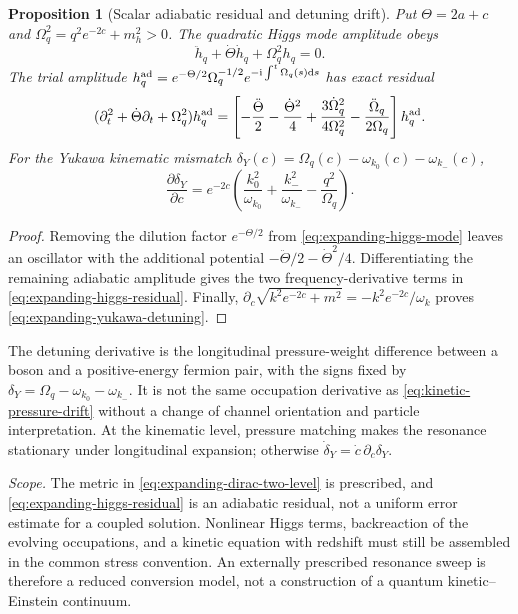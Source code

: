 \documentclass[11pt,a4paper,oneside]{book}
\theoremstyle{plain}
\newtheorem{proposition}[theorem]{Proposition}
\theoremstyle{definition}
\theoremstyle{remark}
\newcommand{\dd}{\mathrm d}
\newcommand{\ii}{\mathrm i}
\newcommand{\src}[2]{\cite{#1}}
\newcommand{\scope}[1]{\par\smallskip\noindent\textit{Scope.} #1\par\smallskip}
\begin{document}
\begin{proposition}[Scalar adiabatic residual and detuning drift]
\label{prop:expanding-scalar-detuning}
Put $\Theta=2a+c$ and $\Omega_q^2=q^2e^{-2c}+m_h^2>0$.
The quadratic Higgs mode amplitude obeys
\begin{equation}
 \ddot h_q+\dot\Theta\dot h_q+\Omega_q^2h_q=0.
 \label{eq:expanding-higgs-mode}
\end{equation}
The trial amplitude
$h_q^{\rm ad}=e^{-\Theta/2}\Omega_q^{-1/2}
 e^{-\ii\int^t\Omega_q(s)\dd s}$ has exact residual
\begin{equation}
 (\partial_t^2+\dot\Theta\partial_t+\Omega_q^2)h_q^{\rm ad}
 =\left[-\frac{\ddot\Theta}{2}-\frac{\dot\Theta^2}{4}
 +\frac{3\dot\Omega_q^2}{4\Omega_q^2}
 -\frac{\ddot\Omega_q}{2\Omega_q}\right]h_q^{\rm ad}.
 \label{eq:expanding-higgs-residual}
\end{equation}
For the Yukawa kinematic mismatch
$\delta_Y(c)=\Omega_q(c)-\omega_{k_0}(c)-\omega_{k_-}(c)$,
\begin{equation}
 \frac{\partial\delta_Y}{\partial c}
 =e^{-2c}\left(
 \frac{k_0^2}{\omega_{k_0}}+\frac{k_-^2}{\omega_{k_-}}
                         -\frac{q^2}{\Omega_q}\right).
 \label{eq:expanding-yukawa-detuning}
\end{equation}
\end{proposition}
\begin{proof}
Removing the dilution factor $e^{-\Theta/2}$ from
\eqref{eq:expanding-higgs-mode} leaves an oscillator with the additional
potential $-\ddot\Theta/2-\dot\Theta^2/4$.  Differentiating the remaining
adiabatic amplitude gives the two frequency-derivative terms in
\eqref{eq:expanding-higgs-residual}.  Finally,
$\partial_c\sqrt{k^2e^{-2c}+m^2}=-k^2e^{-2c}/\omega_k$ proves
\eqref{eq:expanding-yukawa-detuning}.
\end{proof}
\src{R20}{thm:v20v37-wkb,thm:v20v37-drift}

The detuning derivative is the longitudinal pressure-weight difference
between a boson and a positive-energy fermion pair, with the signs fixed
by $\delta_Y=\Omega_q-\omega_{k_0}-\omega_{k_-}$.  It is not the same
occupation derivative as \eqref{eq:kinetic-pressure-drift} without a
change of channel orientation and particle interpretation.  At the
kinematic level, pressure matching makes the resonance stationary under
longitudinal expansion; otherwise $\dot\delta_Y=\dot c\,\partial_c\delta_Y$.

\scope{The metric in \eqref{eq:expanding-dirac-two-level} is prescribed,
and \eqref{eq:expanding-higgs-residual} is an adiabatic residual, not a
uniform error estimate for a coupled solution.  Nonlinear Higgs terms,
backreaction of the evolving occupations, and a kinetic equation with
redshift must still be assembled in the common stress convention.
An externally prescribed resonance sweep is therefore a reduced
conversion model, not a construction of a quantum kinetic--Einstein
continuum.}
\end{document}
